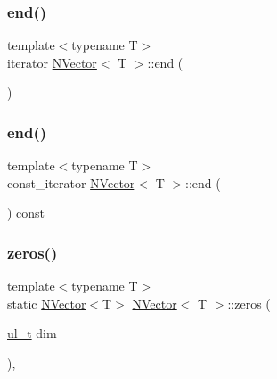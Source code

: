 \subsubsection{\texorpdfstring{end()}{end()}\hspace{0.1cm}{\footnotesize\ttfamily [1/2]}}
{\footnotesize\ttfamily template$<$typename T$>$ \\
iterator \mbox{\hyperlink{class_n_vector}{N\+Vector}}$<$ T $>$\+::end (\begin{DoxyParamCaption}{ }\end{DoxyParamCaption})\hspace{0.3cm}{\ttfamily [inline]}}

\mbox{\label{class_n_vector_ac019e1018e5d0dd8113d2f2605aa2987}} 
\subsubsection{\texorpdfstring{end()}{end()}\hspace{0.1cm}{\footnotesize\ttfamily [2/2]}}
{\footnotesize\ttfamily template$<$typename T$>$ \\
const\+\_\+iterator \mbox{\hyperlink{class_n_vector}{N\+Vector}}$<$ T $>$\+::end (\begin{DoxyParamCaption}{ }\end{DoxyParamCaption}) const\hspace{0.3cm}{\ttfamily [inline]}}

\mbox{\label{class_n_vector_a6253cef3c39dd9d388bbf7d17069bc51}} 
\subsubsection{\texorpdfstring{zeros()}{zeros()}}
{\footnotesize\ttfamily template$<$typename T$>$ \\
static \mbox{\hyperlink{class_n_vector}{N\+Vector}}$<$T$>$ \mbox{\hyperlink{class_n_vector}{N\+Vector}}$<$ T $>$\+::zeros (\begin{DoxyParamCaption}\item[{\mbox{\hyperlink{typedef_8h_a1b140a2034db3f5dfe18a987745df43a}{ul\+\_\+t}}}]{dim }\end{DoxyParamCaption})\hspace{0.3cm}{\ttfamily [inline]}, {\ttfamily [static]}}


